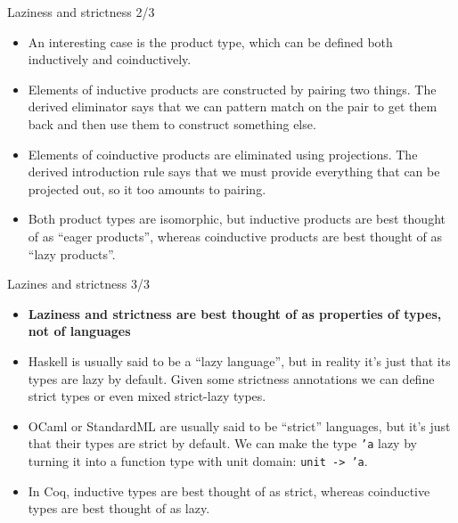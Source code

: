 \documentclass{beamer}
\begin{document}
\begin{frame}{Laziness and strictness 2/3}
\begin{itemize}
	\item An interesting case is the product type, which can be defined both inductively and coinductively.
	\item Elements of inductive products are constructed by pairing two things. The derived eliminator says that we can pattern match on the pair to get them back and then use them to construct something else.
	\item Elements of coinductive products are eliminated using projections. The derived introduction rule says that we must provide everything that can be projected out, so it too amounts to pairing.
	\item Both product types are isomorphic, but inductive products are best thought of as ``eager products'', whereas coinductive products are best thought of as ``lazy products''.
\end{itemize}
\end{frame}

\begin{frame}{Lazines and strictness 3/3}
\begin{itemize}
	\item \textbf{Laziness and strictness are best thought of as properties of types, not of languages}
	\item Haskell is usually said to be a ``lazy language'', but in reality it's just that its types are lazy by default. Given some strictness annotations we can define strict types or even mixed strict-lazy types.
	\item OCaml or StandardML are usually said to be ``strict'' languages, but it's just that their types are strict by default. We can make the type \texttt{'a} lazy by turning it into a function type with unit domain: \texttt{unit -> 'a}.
	\item In Coq, inductive types are best thought of as strict, whereas coinductive types are best thought of as lazy.
\end{itemize}
\end{frame}
\end{document}
